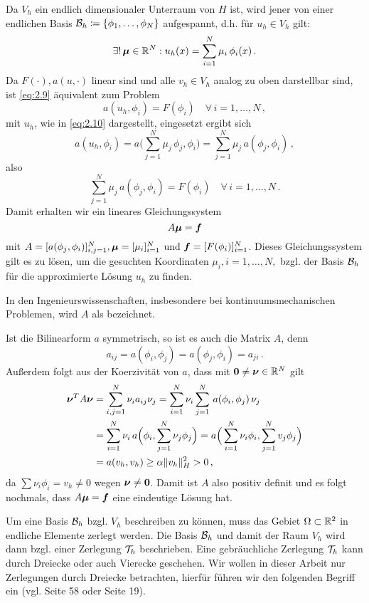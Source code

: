 Da $V_h$ ein endlich dimensionaler Unterraum von $H$ ist, wird jener von einer endlichen Basis $\mathcal B_h \coloneqq \{\phi_1,\ldots,\phi_N\}$ aufgespannt, d.h. für $u_h \in V_h$ gilt:
\begin{align}\label{eq:2.10}
	\exists! \, \boldsymbol\mu \in \mathbb{R}^N :  u_h(x) = \sum_{i = 1}^N \mu_i \,  \phi_i(x) \, .
\end{align}
Da $F(\cdot),a(u,\cdot)$ linear sind und alle $v_h \in V_h$ analog zu oben darstellbar sind, ist \eqref{eq:2.9} äquivalent zum Problem
\[
	a(u_h,\phi_i) = F(\phi_i) \quad \forall \, i = 1, \ldots,N \, ,
\]
mit $u_h$, wie in \eqref{eq:2.10} dargestellt, eingesetzt ergibt sich
\[
	a(u_h,\phi_i) = a \Big( \sum_{j = 1}^N \mu_j \,  \phi_j,\phi_i \Big) = \sum_{j = 1}^N \mu_j \, a(\phi_j,\phi_i) \, ,
\]
also
\[
	 \sum_{j = 1}^N \mu_j \, a(\phi_j,\phi_i) = F(\phi_i)\quad \forall \, i = 1, \ldots,N \, .
\]
Damit erhalten wir ein lineares Gleichungssystem
\[
	A \boldsymbol \mu = \boldsymbol f 
\]
mit $A = [a(\phi_j,\phi_i)]_{i,j=1}^N, \boldsymbol \mu = [\mu_i]_{i=1}^N$ und $\boldsymbol f = [F(\phi_i)]_{i=1}^N$. Dieses Gleichungssystem gilt es zu lösen, um die gesuchten Koordinaten $\mu_i, i = 1,\ldots,N,$ bzgl. der Basis $\mathcal B_h$ für die approximierte Lösung $u_h$ zu finden.

In den Ingenieurswissenschaften, insbesondere bei kontinuumsmechanischen Problemen, wird $A$ als \textit{} bezeichnet.

\begin{bem}\label{bem:2.18}
Ist die Bilinearform $a$ symmetrisch, so ist es auch die Matrix $A$, denn
\[
	a_{ij} = a(\phi_i,\phi_j) = a(\phi_j,\phi_i)= a_{ji} \, .
\]
Außerdem folgt aus der Koerzivität von $a$, dass  mit $\boldsymbol 0 \not = \boldsymbol \nu \in \mathbb{R}^N$ gilt
\begin{align*}
	\boldsymbol \nu^T A \boldsymbol \nu & = \sum_{i,j=1}^N \nu_i a_{ij} \nu_j  =  \sum_{i=1}^N \nu_i\sum_{j=1}^N \, a(\phi_i,\phi_j) \, \nu_j   \\
	& = \sum_{i=1}^N \nu_i \, a\Big(\phi_i,\sum_{j=1}^N\nu_j\phi_j\Big) =  a\Big(\sum_{i=1}^N \nu_i\phi_i,\sum_{j=1}^Nv_j\phi_j\Big) \\
	& = a(v_h,v_h) \ge \alpha \lVert v_h\rVert^2_H > 0 \, ,
\end{align*}
da $\sum \nu_i \phi_i = v_h \not = 0$ wegen $\boldsymbol \nu \not = \boldsymbol 0$. Damit ist $A$ also positiv definit und es folgt nochmals, dass $A \boldsymbol \mu = \boldsymbol f$ eine eindeutige Lösung hat.
\end{bem}


Um eine Basis $\mathcal B_h$ bzgl. $V_h$ beschreiben zu können, muss das Gebiet $\Omega\subset \mathbb{R}^2$ in endliche Elemente zerlegt werden. Die Basis $\mathcal B_h$ und damit der Raum $V_h$ wird dann bzgl. einer Zerlegung $\mathcal T_h$ beschrieben. Eine gebräuchliche Zerlegung $\mathcal T_h$ kann durch Dreiecke oder auch Vierecke geschehen. Wir wollen in dieser Arbeit nur Zerlegungen durch Dreiecke betrachten, hierfür führen wir den folgenden Begriff ein (vgl. \cite{BraeFEM} Seite 58 oder \cite{StarkePDE} Seite 19).


